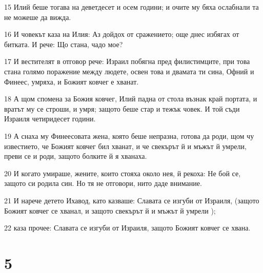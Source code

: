 \par 15 Илий беше тогава на деветдесет и осем години; и очите му бяха ослабнали та не можеше да вижда.
\par 16 И човекът каза на Илия: Аз дойдох от сражението; още днес избягах от битката. И рече: Що стана, чадо мое?
\par 17 И вестителят в отговор рече: Израил побягна пред филистимците, при това стана голямо поражение между людете, освен това и двамата ти сина, Офний и Финеес, умряха, и Божият ковчег е хванат.
\par 18 А щом спомена за Божия ковчег, Илий падна от стола възнак край портата, и вратът му се строши, и умря; защото беше стар и тежък човек. И той съди Израиля четиридесет години.
\par 19 А снаха му Финеесовата жена, която беше непразна, готова да роди, щом чу известието, че Божият ковчег бил хванат, и че свекърът й и мъжът й умрели, преви се и роди, защото болките й я хванаха.
\par 20 И когато умираше, жените, които стояха около нея, й рекоха: Не бой се, защото си родила син. Но тя не отговори, нито даде внимание.
\par 21 И нарече детето Ихавод, като казваше: Славата се изгуби от Израиля, (защото Божият ковчег се хванал, и защото свекърът й и мъжът й умрели );
\par 22 каза прочее: Славата се изгуби от Израиля, защото Божият ковчег се хвана.

\chapter{5}

